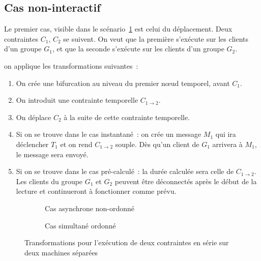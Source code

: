 \documentclass{article}
\newcommand\timenode{nœud temporel\xspace}
\begin{document}
\subsection{Cas non-interactif}
Le premier cas, visible dans le scénario~\ref{scenar.simple} est celui du déplacement.
Deux contraintes $C_1$, $C_2$ se suivent. 
On veut que la première s'exécute sur les clients d'un groupe $G_1$, et que la seconde s'exécute sur les clients d'un groupe $G_2$. 
\begin{figure}[h]
    \centering
    \begin{tikzpicture}
    
    \end{tikzpicture}
    \label{scenar.simple}
\end{figure} on applique les transformations suivantes~: 
\begin{enumerate}
    \item On crée une bifurcation au niveau du premier \timenode, avant $C_1$.
    \item On introduit une contrainte temporelle $C_{1\rightarrow2}$.
    \item On déplace $C_2$ à la suite de cette contrainte temporelle.
    \item Si on se trouve dans le cas instantané~: on crée un message $M_1$ qui ira déclencher $T_1$ et on rend $C_{1\rightarrow2}$ souple.
    Dès qu'un client de $G_1$ arrivera à $M_1$, le message sera envoyé.
    \item Si on se trouve dans le cas pré-calculé~: la durée calculée sera celle de $C_{1\rightarrow2}$. Les clients du groupe $G_1$ et $G_2$ peuvent être déconnectés après le début de la lecture et continueront à fonctionner comme prévu.
\end{enumerate}

\begin{figure}[h]
\centering
\begin{subfigure}{.5\linewidth}
\begin{tikzpicture}

\end{tikzpicture}
\caption{Cas asynchrone non-ordonné}
\end{subfigure}

\begin{subfigure}{.5\linewidth}
    \begin{tikzpicture}
    
    \end{tikzpicture}
    \caption{Cas simultané ordonné}
\end{subfigure}
\caption{Transformations pour l'exécution de deux contraintes en série sur deux machines séparées}
\label{scenar.deplacement}
\end{figure}
\end{document}
